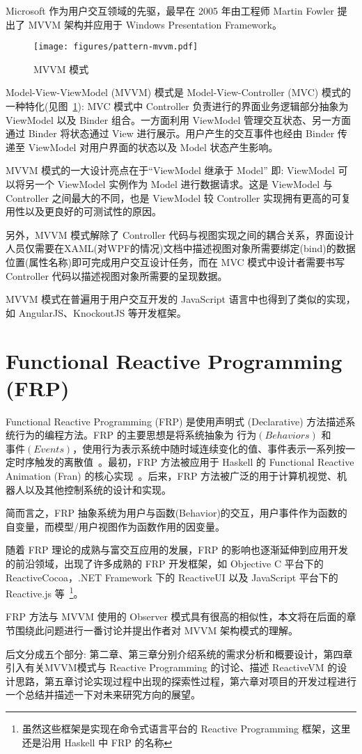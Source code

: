 Microsoft 作为用户交互领域的先驱，最早在 2005 年由工程师 Martin Fowler 提出了 MVVM 架构并应用于 Windows Presentation Framework。

\begin{figure}[!h]
\begin{center}
\texttt{[image: figures/pattern-mvvm.pdf]}
\caption{MVVM 模式\label{MVVMOverview}}
\end{center}
\end{figure}

Model-View-ViewModel (MVVM) 模式是 Model-View-Controller (MVC) 模式的一种特化(见图~\ref{MVVMOverview}): MVC 模式中 Controller 负责进行的界面业务逻辑部分抽象为 ViewModel 以及 Binder 组合。一方面利用 ViewModel 管理交互状态、另一方面通过 Binder 将状态通过 View 进行展示。用户产生的交互事件也经由 Binder 传递至 ViewModel 对用户界面的状态以及 Model 状态产生影响。

MVVM 模式的一大设计亮点在于“ViewModel 继承于 Model” 即: ViewModel 可以将另一个 ViewModel 实例作为 Model 进行数据请求。这是 ViewModel 与 Controller 之间最大的不同，也是 ViewModel 较 Controller 实现拥有更高的可复用性以及更良好的可测试性的原因。

另外，MVVM 模式解除了 Controller 代码与视图实现之间的耦合关系，界面设计人员仅需要在XAML(对WPF的情况)文档中描述视图对象所需要绑定(bind)的数据位置(属性名称)即可完成用户交互设计任务，而在 MVC 模式中设计者需要书写 Controller 代码以描述视图对象所需要的呈现数据。

MVVM 模式在普遍用于用户交互开发的 JavaScript 语言中也得到了类似的实现，如 AngularJS、KnockoutJS 等开发框架。

\section{Functional Reactive Programming (FRP)}

Functional Reactive Programming (FRP) 是使用声明式 (Declarative) 方法描述系统行为的编程方法。FRP 的主要思想是将系统抽象为 $行为(Behaviors)$ 和 $事件(Events)$，使用行为表示系统中随时域连续变化的值、事件表示一系列按一定时序触发的离散值~\cite{Wan:2000:FRP:358438.349331}。最初，FRP 方法被应用于 Haskell 的 Functional Reactive Animation (Fran) 的核心实现~\cite{Elliott:1997:FRA:258949.258973}。后来，FRP 方法被广泛的用于计算机视觉、机器人以及其他控制系统的设计和实现。

简而言之，FRP 抽象系统为用户与函数(Behavior)的交互，用户事件作为函数的自变量，而模型/用户视图作为函数作用的因变量。

随着 FRP 理论的成熟与富交互应用的发展，FRP 的影响也逐渐延伸到应用开发的前沿领域，出现了许多成熟的 FRP 开发框架，如 Objective C 平台下的 ReactiveCocoa，.NET Framework 下的 ReactiveUI 以及 JavaScript 平台下的 Reactive.js 等~\footnote{虽然这些框架是实现在命令式语言平台的 Reactive Programming 框架，这里还是沿用 Haskell 中 FRP 的名称}。

FRP 方法与 MVVM 使用的 Observer 模式具有很高的相似性，本文将在后面的章节围绕此问题进行一番讨论并提出作者对 MVVM 架构模式的理解。

后文分成五个部分: 第二章、第三章分别介绍系统的需求分析和概要设计，第四章引入有关MVVM模式与 Reactive Programming 的讨论、描述 ReactiveVM 的设计思路，第五章讨论实现过程中出现的探索性过程，第六章对项目的开发过程进行一个总结并描述一下对未来研究方向的展望。

